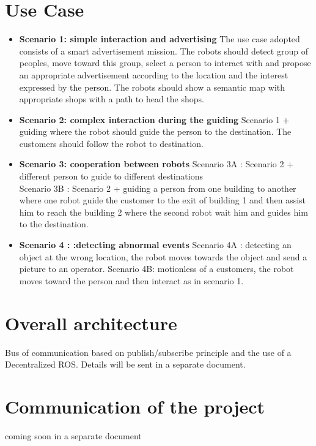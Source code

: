 \documentclass{article}
\begin{document}
\section{Use Case}
\begin{itemize}
\item {\bf Scenario 1: simple interaction and advertising} The use case adopted consists of a smart advertisement mission. The robots should detect group of peoples, move toward this group, select a person to interact with and propose an appropriate advertisement according to the location and the interest expressed by the person. The robots should show a semantic map with appropriate shops with a path to head the shops. 
\item {\bf Scenario 2: complex interaction during the guiding}
Scenario 1 + guiding where the robot should guide the person to the destination. The customers should follow the robot to destination.
\item {\bf Scenario 3: cooperation between robots}
Scenario 3A : Scenario 2 + different person to guide to different destinations \\
Scenario 3B : Scenario 2 + guiding a person from one building to another where one robot guide the customer to the exit of building 1 and then  assist him to reach the building 2 where the second robot wait him and guides him to the destination. 
\item {\bf Scenario 4 : :detecting abnormal events}
Scenario 4A : detecting an object at the wrong location, the robot moves towards the object and send a picture to an operator.
Scenario 4B: motionless of a customers, the robot moves toward the person and then interact as in scenario 1. 
\end{itemize}
\section{Overall architecture}
Bus of communication based on publish/subscribe principle and the use of a Decentralized ROS. Details will be sent in a separate document.
\section{Communication of the project}
coming soon in a separate document
\end{document}
